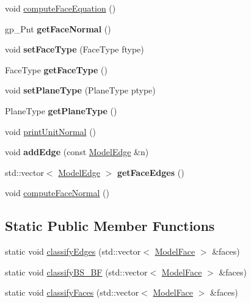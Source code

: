 \begin{DoxyCompactItemize}
\item 
void \hyperlink{classModelFace_ac6d00879fc8784039db1cd303326f18a}{compute\-Face\-Equation} ()
\item 
\hypertarget{classModelFace_a30b9802b65ad3db53121d4da7215e0e9}{gp\-\_\-\-Pnt {\bfseries get\-Face\-Normal} ()}\label{classModelFace_a30b9802b65ad3db53121d4da7215e0e9}

\item 
\hypertarget{classModelFace_a11e3cf3a4eae9a30e59c37669fecf003}{void {\bfseries set\-Face\-Type} (Face\-Type ftype)}\label{classModelFace_a11e3cf3a4eae9a30e59c37669fecf003}

\item 
\hypertarget{classModelFace_acf740712dfb0d9583b4d9f3f501e2ebc}{Face\-Type {\bfseries get\-Face\-Type} ()}\label{classModelFace_acf740712dfb0d9583b4d9f3f501e2ebc}

\item 
\hypertarget{classModelFace_a801dcaeed2a3079d1f168eba1ff2fa9b}{void {\bfseries set\-Plane\-Type} (Plane\-Type ptype)}\label{classModelFace_a801dcaeed2a3079d1f168eba1ff2fa9b}

\item 
\hypertarget{classModelFace_ae1959b248ed0a313ea20da30d5745c87}{Plane\-Type {\bfseries get\-Plane\-Type} ()}\label{classModelFace_ae1959b248ed0a313ea20da30d5745c87}

\item 
void \hyperlink{classModelFace_aa3be5b689b9a58787237b3796be24b71}{print\-Unit\-Normal} ()
\item 
\hypertarget{classModelFace_af2be0135b073a01349a740e1a5f53ba7}{void {\bfseries add\-Edge} (const \hyperlink{classModelEdge}{Model\-Edge} \&n)}\label{classModelFace_af2be0135b073a01349a740e1a5f53ba7}

\item 
\hypertarget{classModelFace_a320c3f19bef69664d9157f8b641b9f82}{std\-::vector$<$ \hyperlink{classModelEdge}{Model\-Edge} $>$ {\bfseries get\-Face\-Edges} ()}\label{classModelFace_a320c3f19bef69664d9157f8b641b9f82}

\item 
void \hyperlink{classModelFace_a68807415019fb1e6bf38d779b34fc3bb}{compute\-Face\-Normal} ()
\end{DoxyCompactItemize}
\subsection*{Static Public Member Functions}
\begin{DoxyCompactItemize}
\item 
static void \hyperlink{classModelFace_a0b3dcbc372588a50785e2252fedcfab2}{classify\-Edges} (std\-::vector$<$ \hyperlink{classModelFace}{Model\-Face} $>$ \&faces)
\item 
static void \hyperlink{classModelFace_a239a33e0969b8b740f7dcb0b26a7aebd}{classify\-B\-S\-\_\-\-B\-F} (std\-::vector$<$ \hyperlink{classModelFace}{Model\-Face} $>$ \&faces)
\item 
static void \hyperlink{classModelFace_a787db625e224903c894808c8aed7056b}{classify\-Faces} (std\-::vector$<$ \hyperlink{classModelFace}{Model\-Face} $>$ \&faces)
\end{DoxyCompactItemize}



